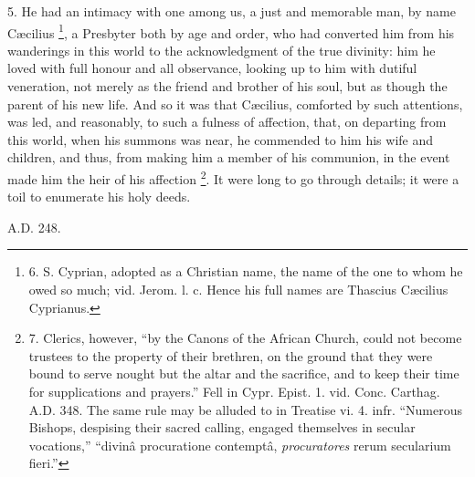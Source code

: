 5. He had an intimacy with one
among us, a just and memorable man, by name Cæcilius \footnote{6. S.
Cyprian, adopted as a Christian name, the name of the one to whom he
owed so much; vid. Jerom. l. c. Hence his full names are Thascius Cæcilius
Cyprianus.}, a Presbyter both by age and order, who had converted him from
his wanderings in this world to the acknowledgment of the true
divinity: him he loved with full honour and all observance, looking up
to him with dutiful veneration, not merely as the friend and brother
of his soul, but as though the parent of his new life. And so it
was that Cæcilius, comforted by such attentions, was led, and
reasonably, to such a fulness of affection, that, on departing from
this world, when his summons was near, he commended to him his wife
and children, and thus, from making him a member of his communion, in
the event made him the heir of his affection \footnote{7.
Clerics, however, ``by the Canons of the African Church, could not
become trustees to the property of their brethren, on the ground that
they were bound to serve nought but the altar and the sacrifice, and
to keep their time for supplications and prayers.'' Fell in Cypr. Epist.
1. vid. Conc. Carthag. A.D. 348. The same rule may be alluded to in
Treatise vi. 4. infr. ``Numerous Bishops, despising their sacred
calling, engaged themselves in secular vocations,'' ``divinâ
procuratione contemptâ, \emph{procuratores} rerum secularium fieri.''}. It were long to go through details; it were a toil to
enumerate his holy deeds.

A.D. 248.

